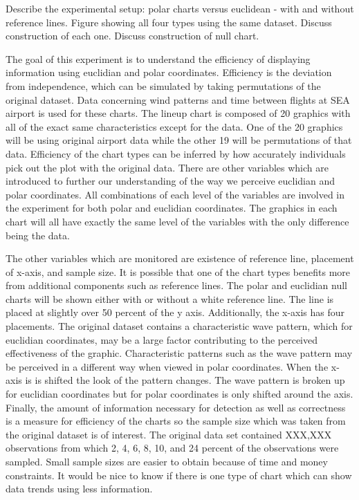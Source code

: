 Describe the experimental setup: polar charts versus euclidean - with and without reference lines.
Figure showing all four types using the same dataset. 
Discuss construction of each one. Discuss construction of null chart.

The goal of this experiment is to understand the efficiency of displaying information using euclidian and polar coordinates. Efficiency is the deviation from independence, which can be simulated by taking permutations of the original dataset. Data concerning wind patterns and time between flights at SEA airport is used for these charts. The lineup chart is composed of 20 graphics with all of the exact same characteristics except for the data. One of the 20 graphics will be using original airport data while the other 19 will be permutations of that data. Efficiency of the chart types can be inferred by how accurately individuals pick out the plot with the original data. There are other variables which are introduced to further our understanding of the way we perceive euclidian and polar coordinates. All combinations of each level of the variables are involved in the experiment for both polar and euclidian coordinates. The graphics in each chart will all have exactly the same level of the variables with the only difference being the data. 

The other variables which are monitored are existence of reference line, placement of x-axis, and sample size. It is possible that one of the chart types benefits more from additional components such as reference lines. The polar and euclidian null charts will be shown either with or without a white reference line. The line is placed at slightly over 50 percent of the y axis. Additionally, the x-axis has four placements. The original dataset contains a characteristic wave pattern, which for euclidian coordinates, may be a large factor contributing to the perceived effectiveness of the graphic. Characteristic patterns such as the wave pattern may be perceived in a different way when viewed in polar coordinates. When the x-axis is is shifted the look of the pattern changes. The wave pattern is broken up for euclidian coordinates but for polar coordinates is only shifted around the axis. Finally, the amount of information necessary for detection as well as correctness is a measure for efficiency of the charts so the sample size which was taken from the original dataset is of interest. The original data set contained XXX,XXX observations from which 2, 4, 6, 8, 10, and 24 percent of the observations were sampled. Small sample sizes are easier to obtain because of time and money constraints. It would be nice to know if there is one type of chart which can show data trends using less information. 


